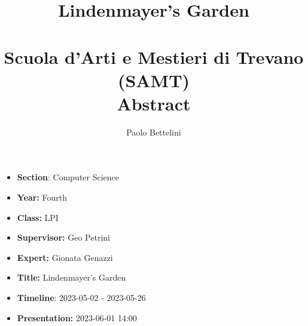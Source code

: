 \documentclass[a4paper]{article}
\title{%
    Lindenmayer's Garden \\
    \phantom{} \\
    \large Scuola d'Arti e Mestieri di Trevano (SAMT) \\
    \large Abstract
}
\author{Paolo Bettelini}
\date{}
\begin{document}

\begin{minipage}{0.7\textwidth}
    \maketitle
\end{minipage}
\begin{minipage}{0.3\textwidth}
\end{minipage}

\vspace{1.5cm}


\begin{figure}[h]
    \begin{minipage}{0.5\textwidth}
    \end{minipage}
    \begin{minipage}{0.5\textwidth}
    \end{minipage}
\end{figure}

\begin{minipage}{0.5\textwidth}
\begin{itemize}
    \item \textbf{Section}: Computer Science
    \item \textbf{Year:} Fourth
    \item \textbf{Class:} LPI
    \item \textbf{Supervisor:} Geo Petrini
\end{itemize}
\end{minipage}
\begin{minipage}{0.5\textwidth}
\begin{itemize}
    \item \textbf{Expert:} Gionata Genazzi
    \item \textbf{Title:} Lindenmayer's Garden
    \item \textbf{Timeline}: 2023-05-02 - 2023-05-26
    \item \textbf{Presentation:} 2023-06-01 14:00
\end{itemize}
\end{minipage}
\end{document}

